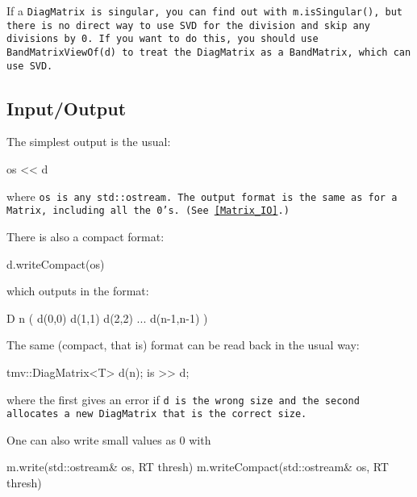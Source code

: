 If a \tt{DiagMatrix} is singular, you can find out with \tt{m.isSingular()},
but there is no direct way to use SVD for the division and skip any
divisions by 0.  If you want to do this, you should use \tt{BandMatrixViewOf(d)} to 
treat the \tt{DiagMatrix} as a \tt{BandMatrix}, which can use SVD.

\subsection{Input/Output}
\label{DiagMatrix_IO}

The simplest output is the usual:
\begin{tmvcode}
os << d
\end{tmvcode}
where \tt{os} is any \tt{std::ostream}.
The output format is the same as for a \tt{Matrix}, including all the 0's.
(See \ref{Matrix_IO}.)


There is also a compact format:
\begin{tmvcode}
d.writeCompact(os)
\end{tmvcode}
which outputs in the format:
\begin{tmvcode}
D n ( d(0,0)  d(1,1)  d(2,2)  ...  d(n-1,n-1) )
\end{tmvcode}

The same (compact, that is) format can be read back in the usual way:
\begin{tmvcode}
tmv::DiagMatrix<T> d(n);
is >> d;
\end{tmvcode}
where the first gives an error if \tt{d} is the wrong size and the second allocates
a new \tt{DiagMatrix} that is the correct size.

One can also write small values as 0 with
\begin{tmvcode}
m.write(std::ostream& os, RT thresh)
m.writeCompact(std::ostream& os, RT thresh)
\end{tmvcode}

